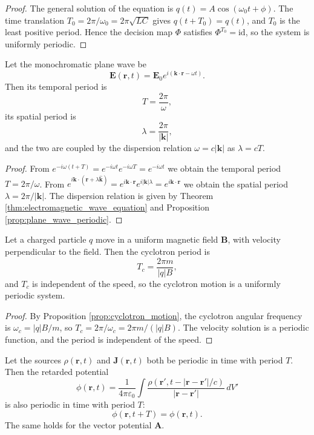 \begin{proof}
The general solution of the equation is $q(t)=A\cos(\omega_0t+\phi)$. The time translation $T_0=2\pi/\omega_0=2\pi\sqrt{LC}$ gives $q(t+T_0)=q(t)$, and $T_0$ is the least positive period. Hence the decision map $\Phi$ satisfies $\Phi^{T_0}=\mathrm{id}$, so the system is uniformly periodic.
\end{proof}

\begin{lemma}\label{lem:plane_wave_periodic_decision}
Let the monochromatic plane wave be
\[
\mathbf E(\mathbf r,t)=\mathbf E_0e^{i(\mathbf k\cdot\mathbf r-\omega t)}.
\]
Then its temporal period is
\[
T=\frac{2\pi}{\omega},
\]
its spatial period is
\[
\lambda=\frac{2\pi}{|\mathbf k|},
\]
and the two are coupled by the dispersion relation $\omega=c|\mathbf k|$ as $\lambda=cT$.
\end{lemma}

\begin{proof}
From $e^{-i\omega(t+T)}=e^{-i\omega t}e^{-i\omega T}=e^{-i\omega t}$ we obtain the temporal period $T=2\pi/\omega$. From $e^{i\mathbf k\cdot(\mathbf r+\lambda\hat{\mathbf k})}=e^{i\mathbf k\cdot\mathbf r}e^{i|\mathbf k|\lambda}=e^{i\mathbf k\cdot\mathbf r}$ we obtain the spatial period $\lambda=2\pi/|\mathbf k|$. The dispersion relation is given by Theorem \ref{thm:electromagnetic_wave_equation} and Proposition \ref{prop:plane_wave_periodic}.
\end{proof}

\begin{lemma}\label{lem:cyclotron_periodic}
Let a charged particle $q$ move in a uniform magnetic field $\mathbf B$, with velocity perpendicular to the field. Then the cyclotron period is
\[
T_c=\frac{2\pi m}{|q|B},
\]
and $T_c$ is independent of the speed, so the cyclotron motion is a uniformly periodic system.
\end{lemma}

\begin{proof}
By Proposition \ref{prop:cyclotron_motion}, the cyclotron angular frequency is $\omega_c=|q|B/m$, so $T_c=2\pi/\omega_c=2\pi m/(|q|B)$. The velocity solution is a periodic function, and the period is independent of the speed.
\end{proof}

\begin{lemma}\label{lem:retarded_period_preserved}
Let the sources $\rho(\mathbf r,t)$ and $\mathbf J(\mathbf r,t)$ both be periodic in time with period $T$. Then the retarded potential
\[
\phi(\mathbf r,t)=\frac{1}{4\pi\varepsilon_0}\int\frac{\rho(\mathbf r',t-|\mathbf r-\mathbf r'|/c)}{|\mathbf r-\mathbf r'|}\,dV'
\]
is also periodic in time with period $T$:
\[
\phi(\mathbf r,t+T)=\phi(\mathbf r,t).
\]
The same holds for the vector potential $\mathbf A$.
\end{lemma}

